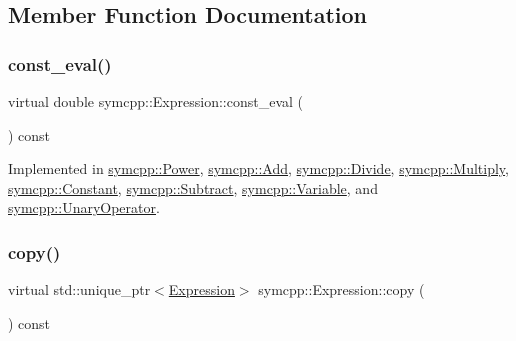 \subsection{Member Function Documentation}
\mbox{\label{classsymcpp_1_1Expression_a81c8069347f586cb5632338d97c278ad}} 
\subsubsection{\texorpdfstring{const\_eval()}{const\_eval()}}
{\footnotesize\ttfamily virtual double symcpp\+::\+Expression\+::const\+\_\+eval (\begin{DoxyParamCaption}{ }\end{DoxyParamCaption}) const\hspace{0.3cm}{\ttfamily [pure virtual]}}



Implemented in \mbox{\hyperlink{classsymcpp_1_1Power_ac344573e85b3db4a324ba3635244c8ca}{symcpp\+::\+Power}}, \mbox{\hyperlink{classsymcpp_1_1Add_af3e5c83af088ffc00849e852e18b055c}{symcpp\+::\+Add}}, \mbox{\hyperlink{classsymcpp_1_1Divide_a18ab0e9eddd473ee5400607b9e6ea2b0}{symcpp\+::\+Divide}}, \mbox{\hyperlink{classsymcpp_1_1Multiply_a1d9b8023ab0bf35c011eb7f3ee8d4c32}{symcpp\+::\+Multiply}}, \mbox{\hyperlink{classsymcpp_1_1Constant_a9c2a9089ae171c2403e053a566929b45}{symcpp\+::\+Constant}}, \mbox{\hyperlink{classsymcpp_1_1Subtract_a619e8733e2b9c07f9bcdb1c82781fad9}{symcpp\+::\+Subtract}}, \mbox{\hyperlink{classsymcpp_1_1Variable_a822c9e3e85da6e89949a9f2df7244f5c}{symcpp\+::\+Variable}}, and \mbox{\hyperlink{classsymcpp_1_1UnaryOperator_ae44aa26276abde61e16be12814075d0a}{symcpp\+::\+Unary\+Operator}}.

\mbox{\label{classsymcpp_1_1Expression_a2e7de5a295ccf0efdc9b34cea7ba3d0b}} 
\subsubsection{\texorpdfstring{copy()}{copy()}}
{\footnotesize\ttfamily virtual std\+::unique\+\_\+ptr$<$\mbox{\hyperlink{classsymcpp_1_1Expression}{Expression}}$>$ symcpp\+::\+Expression\+::copy (\begin{DoxyParamCaption}{ }\end{DoxyParamCaption}) const\hspace{0.3cm}{\ttfamily [pure virtual]}}




